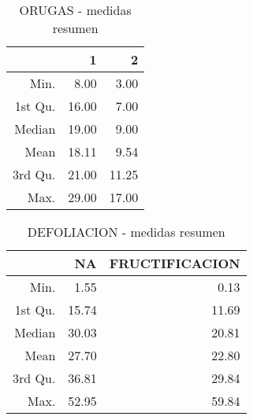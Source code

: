 \begin{table}[ht]
\centering
\begin{tabular}{rrr}
  \hline
 & 1 & 2 \\ 
  \hline
Min. & 8.00 & 3.00 \\ 
  1st Qu. & 16.00 & 7.00 \\ 
  Median & 19.00 & 9.00 \\ 
  Mean & 18.11 & 9.54 \\ 
  3rd Qu. & 21.00 & 11.25 \\ 
  Max. & 29.00 & 17.00 \\ 
   \hline
\end{tabular}
\caption{ORUGAS - medidas resumen} 
\label{table:summary_orugas}
\end{table}
\begin{table}[ht]
\centering
\begin{tabular}{rrr}
  \hline
 & NA & FRUCTIFICACION \\ 
  \hline
Min. & 1.55 & 0.13 \\ 
  1st Qu. & 15.74 & 11.69 \\ 
  Median & 30.03 & 20.81 \\ 
  Mean & 27.70 & 22.80 \\ 
  3rd Qu. & 36.81 & 29.84 \\ 
  Max. & 52.95 & 59.84 \\ 
   \hline
\end{tabular}
\caption{DEFOLIACION - medidas resumen} 
\label{table:summary_defoliacion}
\end{table}
